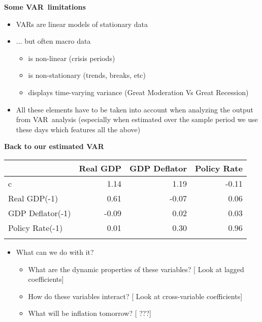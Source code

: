 \documentclass[10pt,handout]{beamer}
\begin{document}
\begin{frame}
{\textbf{Some VAR\ limitations}}

\begin{itemize}
\item VARs are {{\color{red} linear}} models of {{\color{red} stationary data%
}}\bigskip 

\item ... but often macro data

\begin{itemize}
\item is non-linear (crisis periods)

\item is non-stationary (trends, breaks, etc)

\item displays time-varying variance (Great Moderation Vs Great
Recession)\bigskip \pause
\end{itemize}

\item All these elements have to be taken into account when analyzing the
output from VAR\ analysis (especially when estimated over the sample period
we use these days which features all the above)
\end{itemize}
\end{frame}

\vspace{.1cm}

\begin{frame}
{\textbf{Back to our estimated VAR}} 
\begin{table}[tbph]
{\footnotesize \centering%
\begin{tabular}{lrrr}
\addlinespace\toprule & Real GDP & GDP Deflator & Policy Rate \\ 
\midrule c & 1.14 & 1.19 & -0.11 \\ 
Real GDP(-1) & 0.61 & -0.07 & 0.06 \\ 
GDP Deflator(-1) & -0.09 & 0.02 & 0.03 \\ 
Policy Rate(-1) & 0.01 & 0.30 & 0.96 \\ 
\bottomrule &  &  & 
\end{tabular}%
}
\end{table}

\begin{itemize}
\item What can we do with it?\smallskip

\begin{itemize}
\item What are the dynamic properties of these variables? [{{\color{red}
Look at lagged coefficients}}]\smallskip \pause

\item How do these variables interact? [{{\color{red} Look at cross-variable
coefficients}}]\smallskip \pause

\item What will be inflation tomorrow? [{{\color{red} ???}}]
\end{itemize}
\end{itemize}
\end{frame}
\end{document}
